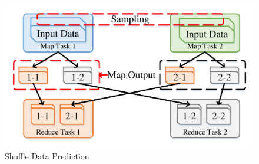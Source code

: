 \begin{figure}
	\centering
	\includegraphics[width=0.9\linewidth]{fig/shuffle}
	\caption{Shuffle Data Prediction}
	\label{fig:shuffle}
\end{figure}

